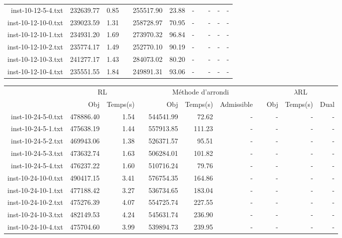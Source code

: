 \begin{landscape}
\begin{table}[h!]
\begin{tabular}{@{}rrrcrrrcrrr@{}}
inst-10-12-5-4.txt & 232639.77 & 0.85 & & 255517.90 & 23.88 & - & & - & - & - \\
inst-10-12-10-0.txt & 239023.59 & 1.31 & & 258728.97 & 70.95 & - & & - & - & - \\
inst-10-12-10-1.txt & 234931.20 & 1.69 & & 273970.32 & 96.84 & - & & - & - & - \\
inst-10-12-10-2.txt & 235774.17 & 1.49 & & 252770.10 & 90.19 & - & & - & - & - \\
inst-10-12-10-3.txt & 241277.17 & 1.43 & & 284073.02 & 80.20 & - & & - & - & - \\
inst-10-12-10-4.txt & 235551.55 & 1.84 & & 249891.31 & 93.06 & - & & - & - & - \\

\end{tabular}
\end{table}
\end{landscape}
\newpage

\begin{landscape}

\begin{table}[h!]\centering
{}
\begin{tabular}{@{}rrrcrrrcrrr@{}}\toprule
& \multicolumn{2}{c}{RL} & \phantom{abc} & \multicolumn{3}{c}{Méthode d'arrondi} & \phantom{abc} & \multicolumn{3}{c}{$\lambda$RL}\\
\cmidrule{2-3} \cmidrule{5-7} \cmidrule{9-11}
& Obj & Temps(s) & & Obj & Temps(s) & Admissible & & Obj & Temps(s) & Dual\\ \midrule

inst-10-24-5-0.txt & 478886.40 & 1.54 & & 544541.99 & 72.62 & - & & - & - & - \\
inst-10-24-5-1.txt & 475638.19 & 1.44 & & 557913.85 & 111.23 & - & & - & - & - \\
inst-10-24-5-2.txt & 469943.06 & 1.38 & & 526371.57 & 95.51 & - & & - & - & - \\
inst-10-24-5-3.txt & 473632.74 & 1.63 & & 506284.01 & 101.82 & - & & - & - & - \\
inst-10-24-5-4.txt & 476237.22 & 1.60 & & 510716.24 & 79.76 & - & & - & - & - \\
inst-10-24-10-0.txt & 490417.15 & 3.41 & & 576754.35 & 164.86 & - & & - & - & - \\
inst-10-24-10-1.txt & 477188.42 & 3.27 & & 536734.65 & 183.04 & - & & - & - & - \\
inst-10-24-10-2.txt & 475276.39 & 4.07 & & 554725.74 & 227.55 & - & & - & - & - \\
inst-10-24-10-3.txt & 482149.53 & 4.24 & & 545631.74 & 236.90 & - & & - & - & - \\
inst-10-24-10-4.txt & 475704.60 & 3.99 & & 539894.73 & 239.95 & - & & - & - & - \\

\end{tabular}
\end{table}

\end{landscape}